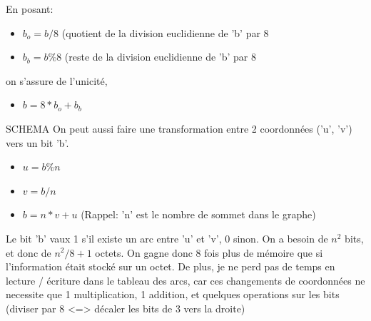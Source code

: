 \documentclass[a4paper,10pt]{article}
\begin{document}
    En posant:
    \begin{itemize}[label=-]
      \item \(b_o = b / 8\) (quotient de la division euclidienne de 'b' par 8
      \item \(b_b = b \% 8\) (reste de la division euclidienne de 'b' par 8
    \end{itemize}
    on s'assure de l'unicité,
    \begin{itemize}[label=-]
      \item \(b = 8*b_o+b_b\)
    \end{itemize}
    {SCHEMA}
    On peut aussi faire une transformation entre 2 coordonnées ('u', 'v') vers un bit 'b'.
    \begin{itemize}[label=-]
      \item \(u = b \% n\)
      \item \(v = b / n\)
      \item \(b = n * v + u\) (Rappel: 'n' est le nombre de sommet dans le graphe)
    \end{itemize}
    Le bit 'b' vaux 1 s'il existe un arc entre 'u' et 'v', 0 sinon.
    On a besoin de \(n^2\) bits, et donc de \(n^2 / 8 + 1\) octets.
    On gagne donc 8 fois plus de mémoire que si l'information était stocké sur un octet.
    De plus, je ne perd pas de temps en lecture / écriture dans le tableau des arcs, car ces changements
    de coordonnées ne necessite que 1 multiplication, 1 addition, et quelques operations sur les bits (diviser par 8 <=> décaler
    les bits de 3 vers la droite)\newline
    
\end{document}
